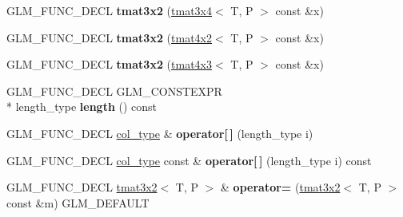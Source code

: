 \begin{DoxyCompactItemize}
\item 
\hypertarget{structglm_1_1tmat3x2_af2e7c96eb468f302bc3b90dbc41e62d7}{G\-L\-M\-\_\-\-F\-U\-N\-C\-\_\-\-D\-E\-C\-L {\bfseries tmat3x2} (\hyperlink{structglm_1_1tmat3x4}{tmat3x4}$<$ T, P $>$ const \&x)}\label{structglm_1_1tmat3x2_af2e7c96eb468f302bc3b90dbc41e62d7}

\item 
\hypertarget{structglm_1_1tmat3x2_aa157cfdb7cf64c70765e4421dac9e4c1}{G\-L\-M\-\_\-\-F\-U\-N\-C\-\_\-\-D\-E\-C\-L {\bfseries tmat3x2} (\hyperlink{structglm_1_1tmat4x2}{tmat4x2}$<$ T, P $>$ const \&x)}\label{structglm_1_1tmat3x2_aa157cfdb7cf64c70765e4421dac9e4c1}

\item 
\hypertarget{structglm_1_1tmat3x2_ac101d14687670dd6916a9e5c161efdf1}{G\-L\-M\-\_\-\-F\-U\-N\-C\-\_\-\-D\-E\-C\-L {\bfseries tmat3x2} (\hyperlink{structglm_1_1tmat4x3}{tmat4x3}$<$ T, P $>$ const \&x)}\label{structglm_1_1tmat3x2_ac101d14687670dd6916a9e5c161efdf1}

\item 
\hypertarget{structglm_1_1tmat3x2_a226137868dbf2b6eb6f89cff7620b732}{G\-L\-M\-\_\-\-F\-U\-N\-C\-\_\-\-D\-E\-C\-L G\-L\-M\-\_\-\-C\-O\-N\-S\-T\-E\-X\-P\-R \\*
length\-\_\-type {\bfseries length} () const }\label{structglm_1_1tmat3x2_a226137868dbf2b6eb6f89cff7620b732}

\item 
\hypertarget{structglm_1_1tmat3x2_a7bf6dec8837ea7b18163629c1fdf60bb}{G\-L\-M\-\_\-\-F\-U\-N\-C\-\_\-\-D\-E\-C\-L \hyperlink{structglm_1_1tvec2}{col\-\_\-type} \& {\bfseries operator\mbox{[}$\,$\mbox{]}} (length\-\_\-type i)}\label{structglm_1_1tmat3x2_a7bf6dec8837ea7b18163629c1fdf60bb}

\item 
\hypertarget{structglm_1_1tmat3x2_a740f9c3e07d2c076a94efb25e69aec0d}{G\-L\-M\-\_\-\-F\-U\-N\-C\-\_\-\-D\-E\-C\-L \hyperlink{structglm_1_1tvec2}{col\-\_\-type} const \& {\bfseries operator\mbox{[}$\,$\mbox{]}} (length\-\_\-type i) const }\label{structglm_1_1tmat3x2_a740f9c3e07d2c076a94efb25e69aec0d}

\item 
\hypertarget{structglm_1_1tmat3x2_ad3e07207fa54ffc24aad6151ab116af8}{G\-L\-M\-\_\-\-F\-U\-N\-C\-\_\-\-D\-E\-C\-L \hyperlink{structglm_1_1tmat3x2}{tmat3x2}$<$ T, P $>$ \& {\bfseries operator=} (\hyperlink{structglm_1_1tmat3x2}{tmat3x2}$<$ T, P $>$ const \&m) G\-L\-M\-\_\-\-D\-E\-F\-A\-U\-L\-T}\label{structglm_1_1tmat3x2_ad3e07207fa54ffc24aad6151ab116af8}


\end{DoxyCompactItemize}
